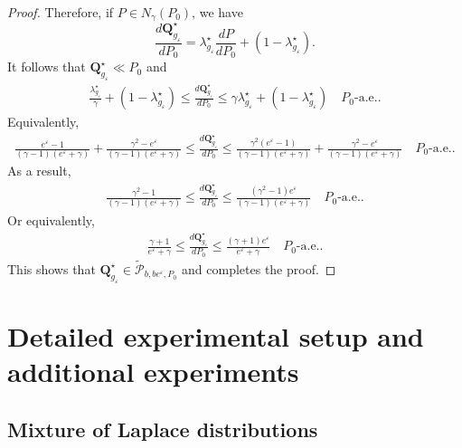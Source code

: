 \documentclass[accepted]{article}
\theoremstyle{plain} %
\theoremstyle{definition}
\theoremstyle{remark}
\newcommand{\eps}{\varepsilon}
\newcommand{\bQ}{\mathbf{Q}}
\newcommand{\N}{\mathbb{N}}
\newcommand{\SA}[1]{\textbf{\textcolor{Magenta}{[#1]}}}
\newcommand{\HG}[1]{\textcolor{cyan}{[#1]}}
\newcommand{\ngb}{N_\gamma(P_0)}
\begin{document}
\begin{proof}
Therefore, if $P \in \ngb$, we have
\[
\frac{d\bQ^\star_{g_\varepsilon}}{dP_0} = \lambda^\star_{g_\varepsilon} \frac{dP}{dP_0} + (1 - \lambda^\star_{g_\varepsilon}).
\]
It follows that $\bQ^\star_{g_\varepsilon} \ll P_0$ and
\begin{align*}
    \frac{\lambda^\star_{g_\varepsilon}}{\gamma} + (1 - \lambda^\star_{g_\varepsilon})\leq \frac{d\bQ^\star_{g_\varepsilon}}{dP_0} \le \gamma \lambda^\star_{g_\varepsilon} + (1 - \lambda^\star_{g_\varepsilon}) \quad P_0\text{-a.e.}.
\end{align*}
Equivalently,
\begin{align*}
   \frac{e^\varepsilon - 1}{(\gamma - 1)(e^\eps + \gamma)} + \frac{\gamma^2 -e^\eps}{(\gamma - 1)(e^\eps + \gamma)}\leq \frac{d\bQ^\star_{g_\varepsilon}}{dP_0} \le \frac{\gamma^2(e^\varepsilon - 1)}{(\gamma - 1)(e^\eps + \gamma)} + \frac{\gamma^2 -e^\eps}{(\gamma - 1)(e^\eps + \gamma)} \quad P_0\text{-a.e.}.
\end{align*}
As a result,
\begin{align*}
    \frac{\gamma^2 -1}{(\gamma - 1)(e^\eps + \gamma)}\leq \frac{d\bQ^\star_{g_\varepsilon}}{dP_0} \le   \frac{(\gamma^2 -1)e^\eps}{(\gamma - 1)(e^\eps + \gamma)} \quad P_0\text{-a.e.}.
\end{align*}
Or equivalently,
\begin{align*}
    \frac{\gamma + 1}{e^\eps + \gamma}\leq \frac{d\bQ^\star_{g_\varepsilon}}{dP_0} \le   \frac{(\gamma + 1)e^\eps}{e^\eps + \gamma} \quad P_0\text{-a.e.}.
\end{align*}
This shows that $\bQ^\star_{g_\eps} \in \tilde{\mathcal{P}}_{b, be^\eps, P_0}$ and completes the proof.

\end{proof}


\section{Detailed experimental setup and additional experiments
}\label{sec: appendix experimental setup and edditional experiments}


\subsection{Mixture of Laplace distributions}\label{appendix: laplace mixture}



\end{document}
